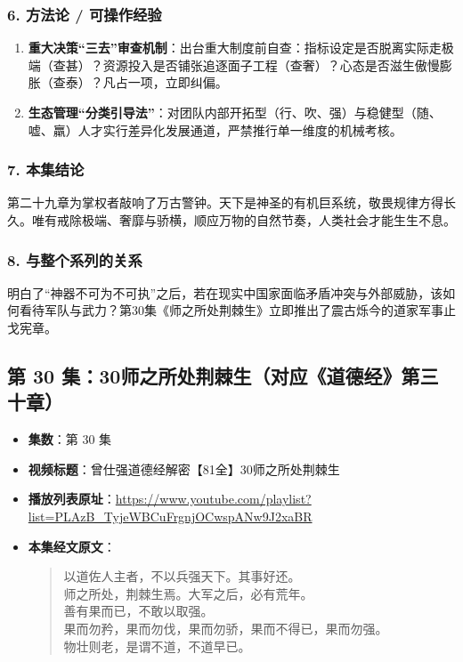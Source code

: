 \subsubsection{6. 方法论 / 可操作经验}
\begin{enumerate}
    \item \textbf{重大决策“三去”审查机制}：出台重大制度前自查：指标设定是否脱离实际走极端（查甚）？资源投入是否铺张追逐面子工程（查奢）？心态是否滋生傲慢膨胀（查泰）？凡占一项，立即纠偏。
    \item \textbf{生态管理“分类引导法”}：对团队内部开拓型（行、吹、强）与稳健型（随、嘘、羸）人才实行差异化发展通道，严禁推行单一维度的机械考核。
\end{enumerate}

\subsubsection{7. 本集结论}
第二十九章为掌权者敲响了万古警钟。天下是神圣的有机巨系统，敬畏规律方得长久。唯有戒除极端、奢靡与骄横，顺应万物的自然节奏，人类社会才能生生不息。

\subsubsection{8. 与整个系列的关系}
明白了“神器不可为不可执”之后，若在现实中国家面临矛盾冲突与外部威胁，该如何看待军队与武力？第30集《师之所处荆棘生》立即推出了震古烁今的道家军事止戈宪章。

\clearpage

\subsection{第 30 集：30师之所处荆棘生（对应《道德经》第三十章）}
\label{sec:ep30}

\begin{itemize}
    \item \textbf{集数}：第 30 集
    \item \textbf{视频标题}：曾仕强道德经解密【81全】30师之所处荆棘生
    \item \textbf{播放列表原址}：\url{https://www.youtube.com/playlist?list=PLAzB_TyjeWBCuFrgnjOCwspANw9J2xaBR}
    \item \textbf{本集经文原文}：
    \begin{quote}\kaishu
    以道佐人主者，不以兵强天下。其事好还。\\
    师之所处，荆棘生焉。大军之后，必有荒年。\\
    善有果而已，不敢以取强。\\
    果而勿矜，果而勿伐，果而勿骄，果而不得已，果而勿强。\\
    物壮则老，是谓不道，不道早已。
    \end{quote}
\end{itemize}

